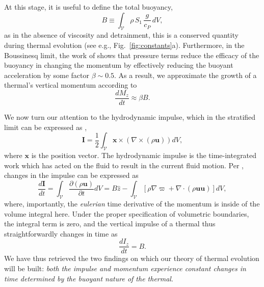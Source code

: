 \documentclass[twocolumn, amsmath, amsfonts, amssymb, trackchanges]{aastex62}
\newcommand{\Div}[1]{\ensuremath{\nabla\cdot\left( #1\right)}}
\newcommand{\grad}{\ensuremath{\nabla}}
\begin{document}
At this stage, it is useful to define the total buoyancy,
\begin{equation}
B \equiv \int_{\mathcal{V}} \rho\, S_1\, \frac{g}{c_P}\, dV,
\label{eqn:tot_buoyancy}
\end{equation}
as in the absence of viscosity and detrainment, this is a conserved quantity during thermal evolution (see e.g., Fig.~\ref{fig:constants}a). 
Furthermore, in the Boussinesq limit, the work of \citet{tarshish&all2018} shows that pressure terms reduce the efficacy of the buoyancy in changing the momentum by effectively reducing the buoyant acceleration by some factor $\beta \sim 0.5$. 
As a result, we approximate the growth of a thermal's vertical momentum according to
\begin{equation}
\frac{d M_z}{dt} \approx \beta B.
\label{eqn:theory_momentum}
\end{equation}

We now turn our attention to the hydrodynamic impulse, which in the stratified limit can be expressed as \citep{shivamoggi2010},
\begin{equation}
\bm{I} = \frac{1}{2}\int_{\mathcal{V}} \bm{x}\times(\grad\times(\rho\bm{u}))dV,
\end{equation}
where $\bm{x}$ is the position vector. 
The hydrodynamic impulse is the time-integrated work which has acted on the fluid to result in the current fluid motion. 
Per \citet{shivamoggi2010}, changes in the impulse can be expressed as
\begin{equation*}
\frac{d\bm{I}}{d t} = \int_{\mathcal{V}}\frac{\partial(\rho\bm{u})}{\partial t}dV
= B\hat{z} - \int_{\mathcal{V}}\left[\rho\grad\varpi + \Div{\rho\bm{u}\bm{u}}\right]dV ,
\end{equation*}
where, importantly, the \emph{eulerian} time derivative of the momentum is inside of the volume integral here. 
Under the proper specification of volumetric boundaries, the integral term is zero, and the vertical impulse of a thermal thus straightforwardly changes in time as
\begin{equation}
\frac{d I_z}{d t} = B.
\label{eqn:change_in_impulse}
\end{equation}
We have thus retrieved the two findings on which our theory of thermal evolution will be built: \emph{both the impulse and momentum experience constant changes in time determined by the buoyant nature of the thermal}.
\end{document}
